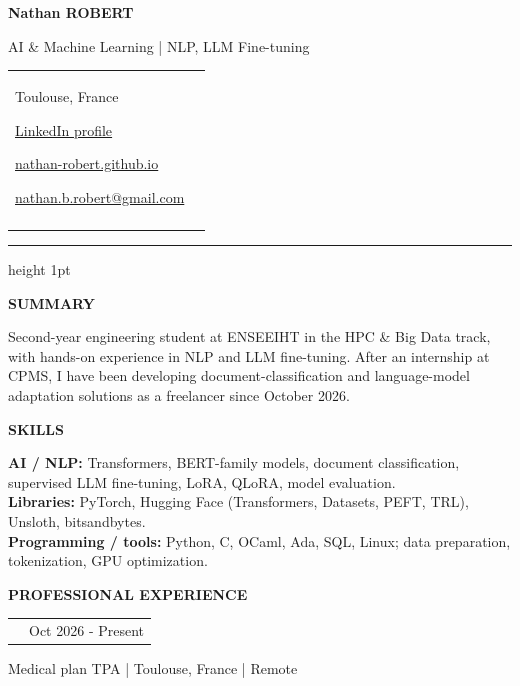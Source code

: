 \documentclass[10pt,a4paper]{extarticle}
\makeatletter
\newcommand{\LinkedInURL}{https://www.linkedin.com/in/nathan-robert-b9423a320/}
\newcommand{\PortfolioURL}{https://nathan-robert.github.io/}
\newcommand{\CPMSURL}{https://www.cpms.fr/}
\newcommand{\cvsection}[1]{%
  \vspace{9pt}
  {\fontsize{10.5}{12.5}\selectfont\bfseries\color{CVAccent}\MakeUppercase{#1}}\par
  \vspace{3pt}{\color{CVGray!35}\hrule height .45pt}\vspace{4pt}}
\newcommand{\cvrole}[3]{%
  \begin{tabularx}{\linewidth}{@{}>{\raggedright\arraybackslash}X r@{}}
  {\bfseries #1} & {\fontsize{9}{11}\selectfont\color{CVGray}#2}
  \end{tabularx}\par
  {\fontsize{9}{11}\selectfont\color{CVGray}#3}\par\vspace{2pt}}
\newcommand{\renderqr}{%
  \begin{minipage}[c]{22mm}\centering
  {\setlength{\fboxsep}{2mm}\href{\PortfolioURL}{\colorbox{white}{\qrcode[height=17mm,level=M]{\PortfolioURL}}}}\\[-1pt]
  {\fontsize{7.5}{9}\selectfont\color{CVGray}PORTFOLIO}
  \end{minipage}}
\makeatother
\begin{document}
\begin{minipage}[c]{.55\textwidth}
  {\fontsize{24}{28}\selectfont\bfseries Nathan ROBERT}\par\vspace{4pt}
  {\fontsize{10}{12}\selectfont AI \& Machine Learning | NLP, LLM Fine-tuning}
\end{minipage}\hfill
\begin{minipage}[c]{.43\textwidth}
  \begin{tabularx}{\linewidth}{@{}>{\raggedleft\arraybackslash}X@{\hspace{6pt}}c@{}}
    \begin{minipage}[c]{\linewidth}\raggedleft
      {\fontsize{9}{12}\selectfont\color{CVGray}Toulouse, France}\par
      {\fontsize{9}{12}\selectfont\href{\LinkedInURL}{LinkedIn profile}}\par
      {\fontsize{8.8}{12}\selectfont\href{\PortfolioURL}{nathan-robert.github.io}}\par
      {\fontsize{8.8}{12}\selectfont\href{mailto:nathan.b.robert@gmail.com}{nathan.b.robert@gmail.com}}
    \end{minipage} & \renderqr
  \end{tabularx}
\end{minipage}
\vspace{8pt}\par
{\color{CVAccent}\hrule height 1pt}\vspace{1pt}


\cvsection{SUMMARY}

Second-year engineering student at ENSEEIHT in the HPC \& Big Data track, with hands-on experience in NLP and LLM fine-tuning. After an internship at CPMS, I have been developing document-classification and language-model adaptation solutions as a freelancer since October 2026.

\cvsection{SKILLS}

\textbf{AI / NLP:} Transformers, BERT-family models, document classification, supervised LLM fine-tuning, LoRA, QLoRA, model evaluation.\\[1.6pt]
\textbf{Libraries:} PyTorch, Hugging Face (Transformers, Datasets, PEFT, TRL), Unsloth, bitsandbytes.\\[1.6pt]
\textbf{Programming / tools:} Python, C, OCaml, Ada, SQL, Linux; data preparation, tokenization, GPU optimization.

\cvsection{PROFESSIONAL EXPERIENCE}

\cvrole{Freelance AI \& Machine Learning | \href{\CPMSURL}{CPMS}}{Oct 2026 - Present}{Medical plan TPA | Toulouse, France | Remote}
\end{document}
